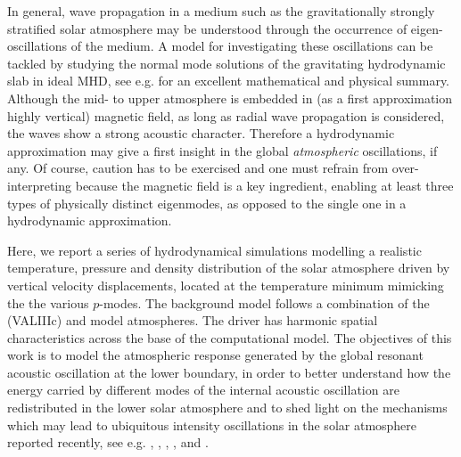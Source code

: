 \documentclass[preprint,authoryear,12pt]{elsarticle}
\begin{document}
In general, wave propagation in a medium such as the gravitationally strongly stratified solar atmosphere may be understood through the occurrence of eigen-oscillations of the medium. A model for investigating these oscillations can be tackled by studying the normal mode solutions of the gravitating  hydrodynamic slab in ideal MHD, see e.g. \citet{Goedbloed2004} for an excellent mathematical and physical summary. Although the mid- to upper atmosphere is embedded in (as a first approximation highly vertical) magnetic field, as long as radial wave propagation is considered, the waves show a strong acoustic character. Therefore a hydrodynamic approximation may give a first insight in the global {\it atmospheric} oscillations, if any. Of course, caution has to be exercised and one must refrain from over-interpreting because the magnetic field is a key ingredient, enabling at least three types of physically distinct eigenmodes, as opposed to the single one in a hydrodynamic approximation.

Here, we report a series of hydrodynamical simulations modelling a realistic temperature, pressure and density distribution of the solar atmosphere driven by vertical velocity displacements,  located at the temperature minimum mimicking the the various $p$-modes. The background model follows a combination of the \citet{Vernazza1981} (VALIIIc) and \citet{McWhirter1975} model atmospheres. The driver has harmonic spatial characteristics across the base of the computational model. The objectives of this work is to model the atmospheric response generated by the global resonant acoustic oscillation at the lower boundary, in order to better understand how the energy carried by different modes of the internal acoustic oscillation are redistributed in the lower solar atmosphere and to shed light on the mechanisms which may lead to ubiquitous intensity oscillations in the solar atmosphere reported recently, see e.g. \citet{Kosovichev2016A}, \citet{Kosovichev2016B}, \citet{Didkovsky2013}, \citet{Didkovsky2013}, \citet{Ireland2015} and \citet{Erdelyi2017}.   
\end{document}
